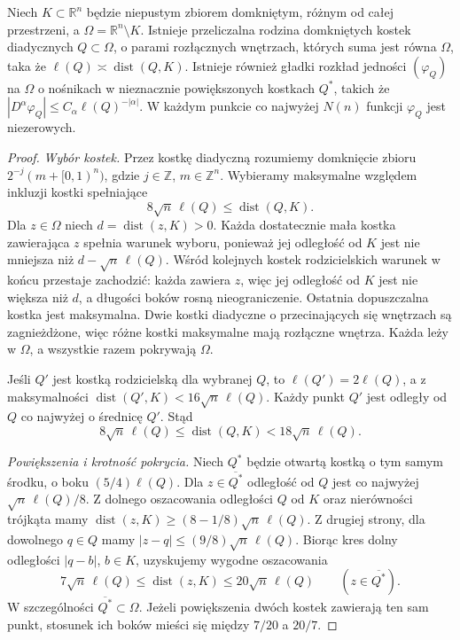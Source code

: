 \begin{lemat}
\label{lem:dzety-whitney-cubes}
Niech $K\subset\mathbb R^n$ będzie niepustym zbiorem
domkniętym, różnym od całej przestrzeni, a
$\Omega=\mathbb R^n\setminus K$. Istnieje przeliczalna
rodzina domkniętych kostek diadycznych $Q\subset\Omega$,
o parami rozłącznych wnętrzach, których suma jest
równa $\Omega$, taka że
$\ell(Q)\asymp\operatorname{dist}(Q,K)$. Istnieje
również gładki rozkład jedności $(\varphi_Q)$ na $\Omega$
o nośnikach w nieznacznie powiększonych kostkach $Q^*$,
takich że
$|D^\alpha\varphi_Q|\le C_\alpha\ell(Q)^{-|\alpha|}$.
W każdym punkcie co najwyżej $N(n)$ funkcji
$\varphi_Q$ jest niezerowych.
\end{lemat}
\begin{proof}
\emph{Wybór kostek.}
Przez kostkę diadyczną rozumiemy domknięcie zbioru
$2^{-j}(m+[0,1)^n)$, gdzie $j\in\mathbb Z$,
$m\in\mathbb Z^n$. Wybieramy maksymalne względem
inkluzji kostki spełniające
\[
 8\sqrt n\,\ell(Q)\le\operatorname{dist}(Q,K).
\]
Dla $z\in\Omega$ niech $d=\operatorname{dist}(z,K)>0$.
Każda dostatecznie mała kostka zawierająca $z$
spełnia warunek wyboru, ponieważ jej odległość od $K$
jest nie mniejsza niż $d-\sqrt n\,\ell(Q)$.
Wśród kolejnych kostek rodzicielskich warunek
w końcu przestaje zachodzić: każda zawiera $z$,
więc jej odległość od $K$ jest nie większa niż $d$,
a długości boków rosną nieograniczenie.
Ostatnia dopuszczalna kostka jest maksymalna.
Dwie kostki diadyczne o przecinających się wnętrzach
są zagnieżdżone, więc różne kostki maksymalne
mają rozłączne wnętrza. Każda leży w $\Omega$,
a wszystkie razem pokrywają $\Omega$.

Jeśli $Q'$ jest kostką rodzicielską dla wybranej $Q$,
to $\ell(Q')=2\ell(Q)$, a z maksymalności
$\operatorname{dist}(Q',K)<16\sqrt n\,\ell(Q)$.
Każdy punkt $Q'$ jest odległy od $Q$ co najwyżej
o średnicę $Q'$. Stąd
\[
 8\sqrt n\,\ell(Q)\le\operatorname{dist}(Q,K)
 <18\sqrt n\,\ell(Q).
\]

\emph{Powiększenia i krotność pokrycia.}
Niech $Q^*$ będzie otwartą kostką o tym samym środku,
o boku $(5/4)\ell(Q)$. Dla $z\in\overline{Q^*}$
odległość od $Q$ jest co najwyżej
$\sqrt n\,\ell(Q)/8$. Z dolnego oszacowania
odległości $Q$ od $K$ oraz nierówności trójkąta mamy
$\operatorname{dist}(z,K)\ge(8-1/8)\sqrt n\,\ell(Q)$.
Z drugiej strony, dla dowolnego $q\in Q$
mamy $|z-q|\le(9/8)\sqrt n\,\ell(Q)$.
Biorąc kres dolny odległości $|q-b|$, $b\in K$,
uzyskujemy wygodne oszacowania
\[
 7\sqrt n\,\ell(Q)\le\operatorname{dist}(z,K)
 \le20\sqrt n\,\ell(Q)\qquad(z\in\overline{Q^*}).
\]
W szczególności $\overline{Q^*}\subset\Omega$.
Jeżeli powiększenia dwóch kostek zawierają ten
sam punkt, stosunek ich boków mieści się między
$7/20$ a $20/7$.


\end{proof}
